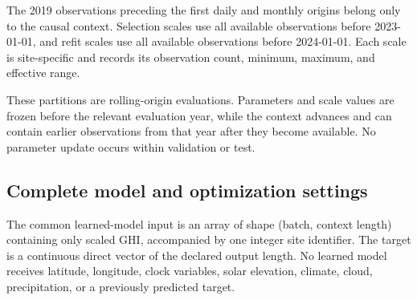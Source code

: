 The 2019 observations preceding the first daily and monthly origins belong only
to the causal context. Selection scales use all available observations before
2023-01-01, and refit scales use all available observations before 2024-01-01.
Each scale is site-specific and records its observation count, minimum, maximum,
and effective range.

These partitions are rolling-origin evaluations. Parameters and scale values
are frozen before the relevant evaluation year, while the context advances and
can contain earlier observations from that year after they become available.
No parameter update occurs within validation or test.

\subsection{Complete model and optimization settings}

The common learned-model input is an array of shape
(batch, context length) containing only scaled GHI, accompanied by one integer
site identifier. The target is a continuous direct vector of the declared
output length. No learned model receives latitude, longitude, clock variables,
solar elevation, climate, cloud, precipitation, or a previously predicted
target.

